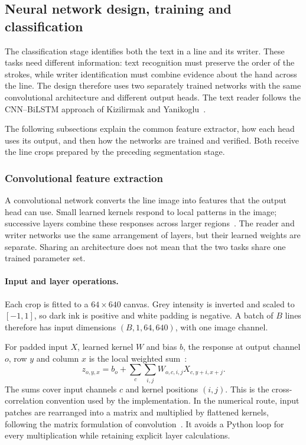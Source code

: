 \subsection{Neural network design, training and classification}
\label{sec:des-class}
The classification stage identifies both the text in a line and its writer. These tasks need different information: text recognition must preserve the order of the strokes, while writer identification must combine evidence about the hand across the line. The design therefore uses two separately trained networks with the same convolutional architecture and different output heads. The text reader follows the CNN--BiLSTM approach of Kizilirmak and Yanikoglu~\cite[pp.~4--5]{kizilirmak2023}.

The following subsections explain the common feature extractor, how each head uses its output, and then how the networks are trained and verified. Both receive the line crops prepared by the preceding segmentation stage.

\subsubsection{Convolutional feature extraction}
A convolutional network converts the line image into features that the output head can use. Small learned kernels respond to local patterns in the image; successive layers combine these responses across larger regions~\cite[pp.~6--8]{lecun1998}. The reader and writer networks use the same arrangement of layers, but their learned weights are separate. Sharing an architecture does not mean that the two tasks share one trained parameter set.

\paragraph{Input and layer operations.}
Each crop is fitted to a $64\times640$ canvas. Grey intensity is inverted and scaled to $[-1,1]$, so dark ink is positive and white padding is negative. A batch of $B$ lines therefore has input dimensions $(B,1,64,640)$, with one image channel.

For padded input $X$, learned kernel $W$ and bias $b$, the response at output channel $o$, row $y$ and column $x$ is the local weighted sum~\cite[pp.~6--8]{lecun1998}:
\begin{equation}
z_{o,y,x}=b_o+\sum_c\sum_{i,j}W_{o,c,i,j}X_{c,y+i,x+j}.
\label{eq:des-conv}
\end{equation}
The sums cover input channels $c$ and kernel positions $(i,j)$. This is the cross-correlation convention used by the implementation. In the numerical route, input patches are rearranged into a matrix and multiplied by flattened kernels, following the matrix formulation of convolution~\cite{chellapilla2006}. It avoids a Python loop for every multiplication while retaining explicit layer calculations.

